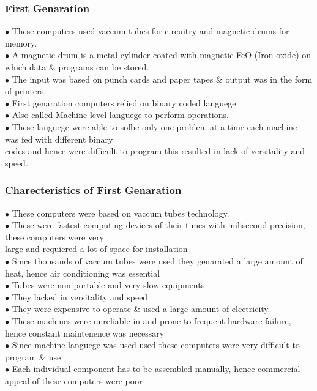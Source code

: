 \documentclass{article}
\begin{document}
	\subsubsection{First Genaration}
	$\bullet$ These computers used vaccum tubes for circuitry and magnetic drums for memory.\\
	$\bullet$ A magnetic drum is a metal cylinder coated with magnetic FeO (Iron oxide) on which data \& programs can be stored. \\
	$\bullet$ The input was based on punch cards and paper tapes \& output was in the form of printers. \\
	$\bullet$ First genaration computers relied on binary coded languege. \\
	$\bullet$ Also called Machine level languege to perform operations. \\
	$\bullet$ These languege were able to solbe only one problem at a time each machine was fed with different binary \\
	\tabto{0.35cm} codes and hence were difficult to program this resulted in lack of versitality and speed.
	
	\subsubsection*{Charecteristics of First Genaration}
	$\bullet$ These computers were based on vaccum tubes technology. \\
	$\bullet$ These were fastest computing devices of their times with milisecond precision, these computers were very \\ \tabto{0.35cm}large and requiered a lot of space for installation \\
	$\bullet$ Since thousands of vaccum tubes were used they genarated a large amount of heat, hence air conditioning was essential \\
	$\bullet$ Tubes were non-portable and very slow equipments \\
	$\bullet$ They lacked in versitality and speed \\
	$\bullet$ They were expensive to operate \& used a large amount of electricity. \\
	$\bullet$ These machines were unreliable in and prone to frequent hardware failure, hence constant maintenence was necessary \\
	$\bullet$ Since machine languege was used used these computers were very difficult to program \& use \\
	$\bullet$ Each individual component has to be assembled manually, hence commercial appeal of these computers were poor
	
\end{document}
